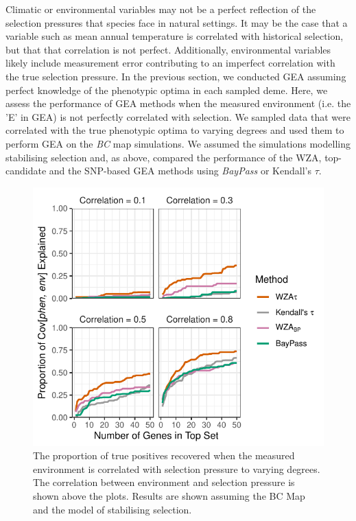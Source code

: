 \documentclass[10pt,twoside,lineno]{GSA_format}
\begin{document}
Climatic or environmental variables may not be a perfect reflection of the selection pressures that species face in natural settings. It may be the case that a variable such as mean annual temperature is correlated with historical selection, but that that correlation is not perfect. Additionally, environmental variables likely include measurement error contributing to an imperfect correlation with the true selection pressure. In the previous section, we conducted GEA assuming perfect knowledge of the phenotypic optima in each sampled deme. Here, we assess the performance of GEA methods when the measured environment (i.e. the 'E' in GEA) is not perfectly correlated with selection. We sampled data that were correlated with the true phenotypic optima to varying degrees and used them to perform GEA on the \textit{BC} map simulations. We assumed the simulations modelling stabilising selection and, as above, compared the performance of the WZA, top-candidate and the SNP-based GEA methods using \textit{BayPass} or Kendall's $\tau$. \\



\begin{figure}
  \includegraphics[width=\linewidth]{Plots/correlatedEnvironments_BCmapResults.pdf} 
  \caption{The proportion of true positives recovered when the measured environment is correlated with selection pressure to varying degrees. The correlation between environment and selection pressure is shown above the plots. Results are shown assuming the BC Map and the model of stabilising selection.}

  \label{fig:truePosCorrelated}
\end{figure}
\end{document}
